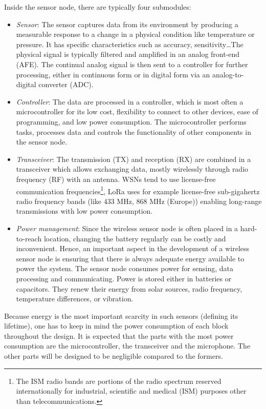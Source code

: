 \documentclass{EPL-master-thesis-covers-EN}
\begin{document}
Inside the sensor node, there are typically four submodules:
\begin{itemize}
 \item \textit{Sensor}: The sensor captures data from its environment by producing a measurable response to a change in a physical condition like temperature or pressure. It has specific characteristics such as accuracy, sensitivity\dots The physical signal is typically filtered and amplified in an analog front-end (AFE). The continual analog signal is then sent to a controller for further processing, either in continuous form or in digital form via an analog-to-digital converter (ADC).
 \item \textit{Controller}: The data are processed in a controller, which is most often a microcontroller for its low cost, flexibility to connect to other devices, ease of programming, and low power consumption. The microcontroller performs tasks, processes data and controls the functionality of other components in the sensor node.
 \item \textit{Transceiver}: The transmission (TX) and reception (RX) are combined in a transceiver which allows exchanging data, mostly wirelessly through radio frequency (RF) with an antenna. WSNs tend to use license-free communication frequencies\footnote{The ISM radio bands are portions of the radio spectrum reserved internationally for industrial, scientific and medical (ISM) purposes other than telecommunications.}, LoRa uses for example license-free sub-gigahertz radio frequency bands (like 433 MHz, 868 MHz (Europe)) enabling long-range transmissions with low power consumption.
 \item \textit{Power management}: Since the wireless sensor node is often placed in a hard-to-reach location, changing the battery regularly can be costly and inconvenient. Hence, an important aspect in the development of a wireless sensor node is ensuring that there is always adequate energy available to power the system. The sensor node consumes power for sensing, data processing and communicating. Power is stored either in batteries or capacitors. They renew their energy from solar sources, radio frequency, temperature differences, or vibration.
\end{itemize}

Because energy is the most important scarcity in such sensors (defining its lifetime), one has to keep in mind the power consumption of each block throughout the design. It is expected that the parts with the most power consumption are the microcontroller, the transceiver and the microphone. The other parts will be designed to be negligible compared to the formers.
\end{document}
